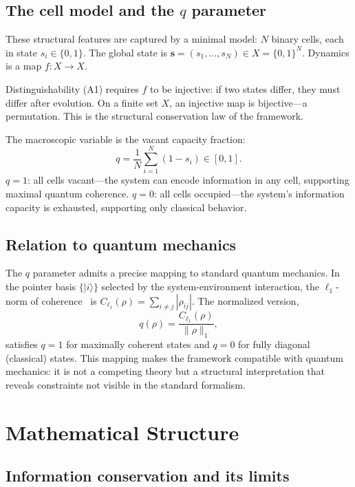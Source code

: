 \documentclass[reprint]{revtex4-2}
\begin{document}
\subsection{The cell model and the $q$ parameter}

These structural features are captured by a minimal model: $N$ binary cells, each in state $s_i\in\{0,1\}$. The global state is $\mathbf{s}=(s_1,\ldots,s_N)\in X=\{0,1\}^N$. Dynamics is a map $f:X\to X$.

Distinguishability (A1) requires $f$ to be injective: if two states differ, they must differ after evolution. On a finite set $X$, an injective map is bijective---a permutation. This is the structural conservation law of the framework.

The macroscopic variable is the vacant capacity fraction:
\begin{equation}
q = \frac{1}{N}\sum_{i=1}^N (1-s_i) \in [0,1].
\end{equation}
$q=1$: all cells vacant---the system can encode information in any cell, supporting maximal quantum coherence. $q=0$: all cells occupied---the system's information capacity is exhausted, supporting only classical behavior.

\subsection{Relation to quantum mechanics}

The $q$ parameter admits a precise mapping to standard quantum mechanics. In the pointer basis $\{|i\rangle\}$ selected by the system-environment interaction, the $\ell_1$-norm of coherence~\cite{Baumgratz2014} is $C_{\ell_1}(\rho)=\sum_{i\neq j}|\rho_{ij}|$. The normalized version,
\begin{equation}
q(\rho) = \frac{C_{\ell_1}(\rho)}{\|\rho\|_1},
\end{equation}
satisfies $q=1$ for maximally coherent states and $q=0$ for fully diagonal (classical) states. This mapping makes the framework compatible with quantum mechanics: it is not a competing theory but a structural interpretation that reveals constraints not visible in the standard formalism.

\section{Mathematical Structure}

\subsection{Information conservation and its limits}
\end{document}
